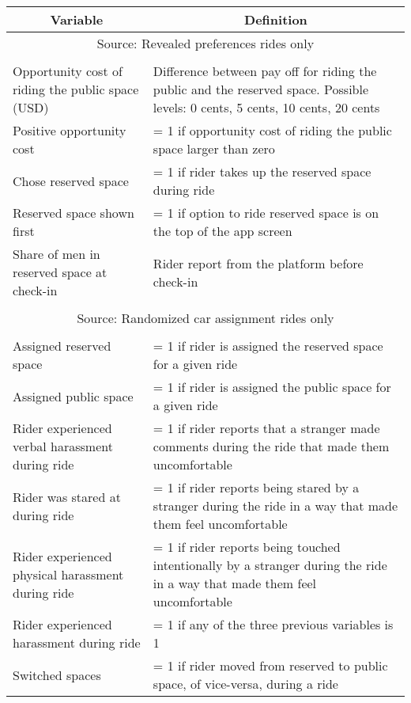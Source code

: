 \begin{table}[H]
    \centering
    \singlespacing
    \footnotesize
    \begin{tabular}{p{.4\linewidth}p{.6\linewidth}}
    \hline\hline 
        \multicolumn{1}{c}{\textbf{Variable}}	&	\multicolumn{1}{c}{\textbf{Definition}}	\\ 
\hline 
\multicolumn{2}{c}{Source: Revealed preferences rides only} \\
\hline\\[-1.8ex]
Opportunity cost of riding the public space (USD)		&	Difference between pay off for riding the public and the reserved space.
Possible levels: 0 cents, 5 cents, 10 cents, 20 cents	\\
Positive opportunity cost		&	= 1 if opportunity cost of riding the public space larger than zero	\\
Chose reserved space		&	= 1 if rider takes up the reserved space during ride	\\
Reserved space shown first		&	= 1 if option to ride reserved space is on the top of the app screen 	\\
Share of men in reserved space at check-in		&	Rider report from the platform before check-in	\\\\[-1.8ex]
\hline
\multicolumn{2}{c}{Source: Randomized car assignment rides only} \\
\hline\\[-1.8ex]
Assigned reserved space	&	= 1 if rider is assigned the reserved space for a given ride	\\
Assigned public space	&	= 1 if rider is assigned the public space for a given ride	\\
Rider experienced verbal harassment during ride	&	= 1 if rider reports that a stranger made comments during the ride that made them uncomfortable	\\
Rider was stared at during ride	&	= 1 if rider reports being stared by a stranger during the ride in a way that made them feel uncomfortable	\\
Rider experienced physical harassment during ride	&	= 1 if rider reports being touched intentionally by a stranger during the ride in a way that made them feel uncomfortable	\\
Rider experienced harassment during ride	&	= 1 if any of the three previous variables is 1	\\
Switched spaces	&	= 1 if rider moved from reserved to public space, of vice-versa, during a ride	\\

\end{tabular}
\end{table}

